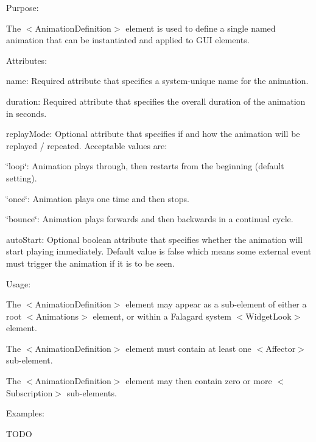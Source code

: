 \begin{DoxyItemize}
\item Purpose\+:
\begin{DoxyItemize}
\item The $<$Animation\+Definition$>$ element is used to define a single named animation that can be instantiated and applied to G\+UI elements.
\end{DoxyItemize}
\item Attributes\+:
\begin{DoxyItemize}
\item {\ttfamily name\+:} Required attribute that specifies a system-\/unique name for the animation.
\item {\ttfamily duration\+:} Required attribute that specifies the overall duration of the animation in seconds.
\item {\ttfamily replay\+Mode\+:} Optional attribute that specifies if and how the animation will be replayed / repeated. Acceptable values are\+:
\begin{DoxyItemize}
\item {\ttfamily \char`\"{}loop\char`\"{}}\+: Animation plays through, then restarts from the beginning (default setting).
\item {\ttfamily \char`\"{}once\char`\"{}}\+: Animation plays one time and then stops.
\item {\ttfamily \char`\"{}bounce\char`\"{}}\+: Animation plays forwards and then backwards in a continual cycle.
\end{DoxyItemize}
\item {\ttfamily auto\+Start\+:} Optional boolean attribute that specifies whether the animation will start playing immediately. Default value is \textquotesingle{}false\textquotesingle{} which means some external event must trigger the animation if it is to be seen.
\end{DoxyItemize}
\item Usage\+:
\begin{DoxyItemize}
\item The $<$Animation\+Definition$>$ element may appear as a sub-\/element of either a root $<$Animations$>$ element, or within a Falagard system $<$Widget\+Look$>$ element.
\item The $<$Animation\+Definition$>$ element must contain at least one $<$Affector$>$ sub-\/element.
\item The $<$Animation\+Definition$>$ element may then contain zero or more $<$Subscription$>$ sub-\/elements.
\end{DoxyItemize}
\item Examples\+:
\begin{DoxyItemize}
\item T\+O\+DO
\end{DoxyItemize}
\end{DoxyItemize}

